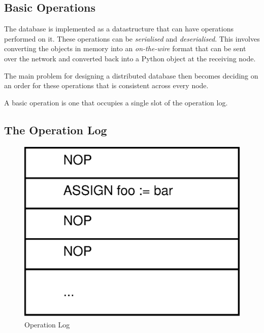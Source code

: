 \documentclass[12pt,twoside,notitlepage]{report}
\begin{document}
\subsection{Basic Operations}

The database is implemented as a datastructure that can have operations performed on it. These
operations can be \emph{serialised} and \emph{deserialised}. This involves converting the objects
in memory into an \emph{on-the-wire} format that can be sent over the network and converted back
into a Python object at the receiving node.

The main problem for designing a distributed database then becomes deciding on an order for these
operations that is consistent across every node.

A basic operation is one that occupies a single slot of the operation log.



\subsection{The Operation Log}

\begin{figure}[htb]
\centering
\includegraphics[scale=0.5]{figs/op-log.eps}
\caption{\label{fig:op-log}Operation Log}
\end{figure}
\end{document}
